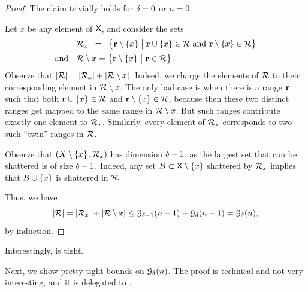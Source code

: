 \begin{proof}
    The claim trivially holds for $\delta=0$ or $n=0$.
    
    Let $x$ be any element of $\textsf{X}$, and consider the sets
    \begin{align*}
        &\RangeSet_x%
        \EQ%
        \Set{ \range \setminus \brc{x} }%
        {\bigl. \range \cup \brc{x} \in \RangeSet \text{ and }%
           \range \setminus \brc{x} \in \RangeSet}%
        \\[0.05cm]
        \text{and}\quad%
        &\RangeSet \setminus x%
        =%
        \Set{ \range
           \setminus \brc{x} }{ \bigl. \range \in \RangeSet}.
    \end{align*}
    Observe that $\left| {{\mathcal{R}}} \right| = \left| {{\mathcal{R}}_x} \right| +
    \left| {{\mathcal{R}} \setminus x} \right|$. Indeed, we charge the elements of
    ${\mathcal{R}}$ to their corresponding element in ${\mathcal{R}}\setminus
    x$.  The only bad case is when there is a range $\mathbf{r}$ such that
    both $\mathbf{r}\cup \left\{ {x} \right\} \in {\mathcal{R}}$ and $\mathbf{r}\setminus
    \left\{ {x} \right\} \in {\mathcal{R}}$, because then these two distinct ranges get
    mapped to the same range in ${\mathcal{R}} \setminus x$. But such
    ranges contribute exactly one element to ${\mathcal{R}}_x$. Similarly,
    every element of ${\mathcal{R}}_x$ corresponds to two such ``twin''
    ranges in ${\mathcal{R}}$.
    
    Observe that $( X \setminus \left\{ {x} \right\}, {\mathcal{R}}_x)$ has \VC{}
    dimension $\delta-1$, as the largest set that can be shattered is of
    size $\delta-1$.  Indeed, any set $B \subset \textsf{X} \setminus
    \left\{ {x} \right\}$ shattered by ${\mathcal{R}}_x$ implies that $B \cup \left\{ {x} \right\}$
    is shattered in ${\mathcal{R}}$.
    
    Thus, we have
    \begin{equation*}
        \cardin{\RangeSet}%
        =%
        \cardin{\RangeSet_x} + \cardin{\RangeSet
           \setminus x} \leq \Growth{\Dim-1}{n-1} +
        \Growth{\Dim}{n-1}%
        =%
        \Growth{\Dim}{n},        
    \end{equation*}
    by induction.
\end{proof}



Interestingly,  is tight.

Next, we show pretty tight bounds on $\Growth{\Dim}{n}$.  The proof is
technical and not very interesting, and it is delegated to
.


